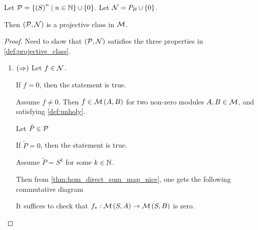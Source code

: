 \begin{example} %
    Let \( {\mathcal{P}} = \left\{  \left(  S  \right)^n \mid n \in {\mathbb{N}}  \right\} \mathop{\cup}\limits \left\{  0  \right\} \). Let \( {\mathcal{N}} = P_B \mathop{\cup}\limits \left\{  0  \right\} \).

    Then \( \left(  {\mathcal{P}}, {\mathcal{N}} \right) \) is a projective class in \( {\mathcal{M}} \).
\end{example}
\begin{proof}
    Need to show that \( \left(  {\mathcal{P}}, {\mathcal{N}}  \right) \) satisfies the three properties in \autoref{def:projective_class}.

    \begin{enumerate}
        \item {
            \( \left(  \Rightarrow  \right) \) Let \( f \in {\mathcal{N}} \).

            If \( f = 0 \), then the statement is true.

            Assume \( f \neq 0 \). Then \( f \in {\mathcal{M}}\left( A, B \right) \) for two non-zero modules \( A, B \in {\mathcal{M}} \), and satisfying \autoref{def:unholy}.
            
            Let \( \tilde{P} \in {\mathcal{P}} \)
            
            If \( \tilde{P} = 0 \), then the statement is true.

            Assume \( \tilde{P} = S^k \) for some \( k \in {\mathbb{N}} \).

            Then from \autoref{thm:hom_direct_sum_map_nice}, one gets the following commutative diagram
            \begin{center}
            \end{center}
            It suffices to check that \( f_*: {\mathcal{M}}\left( S, A \right) \to {\mathcal{M}}\left( S, B \right) \) is zero.

}
\end{enumerate}
\end{proof}
